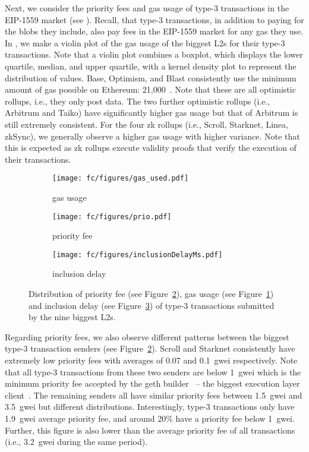 Next, we consider the priority fees and gas usage of type-3 transactions in the EIP-1559 market (see ). Recall, that type-3 transactions, in addition to paying for the blobs they include, also pay fees in the EIP-1559 market for any gas they use. In , we make a violin plot of the gas usage of the biggest L2s for their type-3 transactions. Note that a violin plot combines a boxplot, which displays the lower quartile, median, and upper quartile, with a kernel density plot to represent the distribution of values. Base, Optimism, and Blast consistently use the minimum amount of gas possible on Ethereum: 21,000~\parencite{wood2014yellowpaper}. Note that these are all optimistic rollups, i.e., they only post data. The two further optimistic rollups (i.e., Arbitrum and Taiko) have significantly higher gas usage but that of Arbitrum is still extremely consistent. For the four zk rollups (i.e., Scroll, Starknet, Linea, zkSync), we generally observe a higher gas usage with higher variance. Note that this is expected as zk rollups execute validity proofs that verify the execution of their transactions. 

\begin{figure}[t]\vspace{-6pt}
    \centering
    \begin{subfigure}[t]{1\columnwidth}
        \texttt{[image: fc/figures/gas\_used.pdf]}
    \caption{gas usage}
    \label{fig:gas_used}
    \end{subfigure}    
    \begin{subfigure}[t]{1\columnwidth}
        \texttt{[image: fc/figures/prio.pdf]}
    \caption{priority fee}
    \label{fig:prio}
    \end{subfigure}
    \begin{subfigure}[t]{1\columnwidth}
        \texttt{[image: fc/figures/inclusionDelayMs.pdf]}
    \caption{inclusion delay}
    \label{fig:inclusionDelayMs}
    \end{subfigure}\vspace{-6pt}
    \caption{Distribution of priority fee (see Figure~\ref{fig:prio}), gas usage (see Figure~\ref{fig:gas_used}) and inclusion delay  (see Figure~\ref{fig:inclusionDelayMs}) of type-3 transactions submitted by the nine biggest L2s.}\label{fig:gas}    
\end{figure}

Regarding priority fees, we also observe different patterns between the biggest type-3 transaction senders (see Figure~\ref{fig:prio}). Scroll and Starknet consistently have extremely low priority fees with averages of 0.07 and 0.1~gwei respectively. Note that all type-3 transactions from these two senders are below 1~gwei which is the minimum priority fee accepted by the geth builder~\parencite{szilagyi2024tweet5} -- the biggest execution layer client~\parencite{etheralpha2024}. The remaining senders all have similar priority fees between 1.5~gwei and 3.5~gwei but different distributions. Interestingly, type-3 transactions only have 1.9~gwei average priority fee, and around 20\% have a priority fee below 1~gwei. Further, this figure is also lower than the average priority fee of all transactions (i.e., 3.2~gwei during the same period). 


